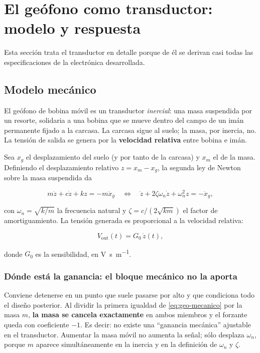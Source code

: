 \section{El ge\'ofono como transductor: modelo y respuesta}
\label{sec:geofono}

Esta secci\'on trata el transductor en detalle porque de \'el se derivan casi todas las
especificaciones de la electr\'onica desarrollada.

\subsection{Modelo mecánico}

El ge\'ofono de bobina m\'ovil es un transductor \emph{inercial}: una masa suspendida por un
resorte, solidaria a una bobina que se mueve dentro del campo de un im\'an permanente
fijado a la carcasa. La carcasa sigue al suelo; la masa, por inercia, no. La tensi\'on de
salida se genera por la \textbf{velocidad relativa} entre bobina e im\'an.

Sea $x_g$ el desplazamiento del suelo (y por tanto de la carcasa) y $x_m$ el de la masa.
Definiendo el desplazamiento relativo $z=x_m-x_g$, la segunda ley de Newton sobre la masa
suspendida da

\begin{equation}
m\ddot{z}+c\dot{z}+kz=-m\ddot{x}_g
\quad\Longleftrightarrow\quad
\ddot{z}+2\zeta\omega_n\dot{z}+\omega_n^{2}z=-\ddot{x}_g,
\label{eq:geo-mecanico}
\end{equation}

con $\omega_n=\sqrt{k/m}$ la frecuencia natural y $\zeta=c/(2\sqrt{km})$ el factor de
amortiguamiento. La tensi\'on generada es proporcional a la velocidad relativa:

\begin{equation}
V_{\mathrm{out}}(t)=G_0\,\dot{z}(t),
\label{eq:geo-fem}
\end{equation}

donde $G_0$ es la sensibilidad, en \si{\volt\second\per\meter}.

\subsubsection{D\'onde est\'a la ganancia: el bloque mec\'anico no la aporta}
\label{sec:geo-donde-ganancia}

Conviene detenerse en un punto que suele pasarse por alto y que condiciona todo el
dise\~no posterior. Al dividir la primera igualdad de \eqref{eq:geo-mecanico} por la masa
$m$, \textbf{la masa se cancela exactamente} en ambos miembros y el forzante queda con
coeficiente $-1$. Es decir: no existe una ``ganancia mec\'anica'' ajustable en el
transductor. Aumentar la masa m\'ovil no aumenta la se\~nal; s\'olo desplaza $\omega_n$,
porque $m$ aparece simult\'aneamente en la inercia y en la definici\'on de $\omega_n$ y
$\zeta$.

